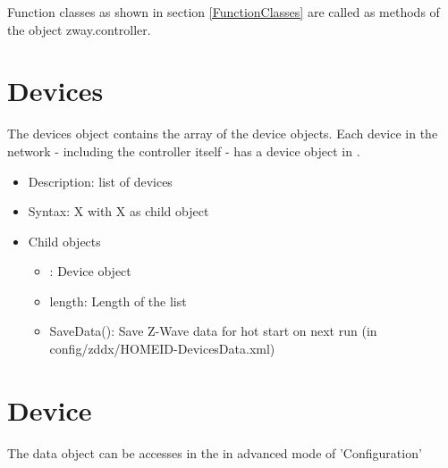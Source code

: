 Function classes as shown in section \ref{FunctionClasses} are called as methods of the object zway.controller.


\section{Devices}

The devices object contains the array of the device objects. Each device in the network - including the 
controller itself -  has a device object in \zway.

\begin {itemize}
\item Description: list of devices
\item Syntax:  X with  X as child object
\item Child objects
\begin {itemize}
\item [m]: Device object
\item length: Length of the list
\item SaveData(): Save \zway Z-Wave data for hot start on next run (in config/zddx/HOMEID-DevicesData.xml)
\end {itemize}
\end {itemize}
 

\section{Device}

The data object can be accesses in the \zweui in advanced mode of 'Configuration'

